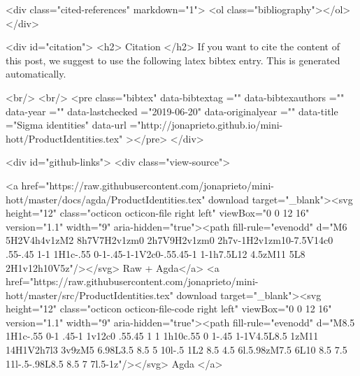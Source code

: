   <div class="cited-references" markdown="1">
  <ol class="bibliography"></ol>
  </div>


  
  <div id="citation">
  <h2> Citation </h2>
  If you want to cite the content of this post,
  we suggest to use the following latex bibtex entry.
  This is generated automatically.

  <br/>
  <br/>
  <pre class="bibtex"
       data-bibtextag =""
       data-bibtexauthors =""
       data-year =""
       data-lastchecked ="2019-06-20"
       data-originalyear =""
       data-title ="Sigma identities"
       data-url ="http://jonaprieto.github.io/mini-hott/ProductIdentities.tex"
  ></pre>
  </div>
  

  <div id="github-links">
    <div class="view-source">
      
        <a href="https://raw.githubusercontent.com/jonaprieto/mini-hott/master/docs/agda/ProductIdentities.tex" download target="_blank"><svg height="12" class="octicon octicon-file right left" viewBox="0 0 12 16" version="1.1" width="9" aria-hidden="true"><path fill-rule="evenodd" d="M6 5H2V4h4v1zM2 8h7V7H2v1zm0 2h7V9H2v1zm0 2h7v-1H2v1zm10-7.5V14c0 .55-.45 1-1 1H1c-.55 0-1-.45-1-1V2c0-.55.45-1 1-1h7.5L12 4.5zM11 5L8 2H1v12h10V5z"/></svg> Raw + Agda</a>
        <a href="https://raw.githubusercontent.com/jonaprieto/mini-hott/master/src/ProductIdentities.tex" download target="_blank"><svg height="12" class="octicon octicon-file-code right left" viewBox="0 0 12 16" version="1.1" width="9" aria-hidden="true"><path fill-rule="evenodd" d="M8.5 1H1c-.55 0-1 .45-1 1v12c0 .55.45 1 1 1h10c.55 0 1-.45 1-1V4.5L8.5 1zM11 14H1V2h7l3 3v9zM5 6.98L3.5 8.5 5 10l-.5 1L2 8.5 4.5 6l.5.98zM7.5 6L10 8.5 7.5 11l-.5-.98L8.5 8.5 7 7l.5-1z"/></svg> Agda </a>
      
